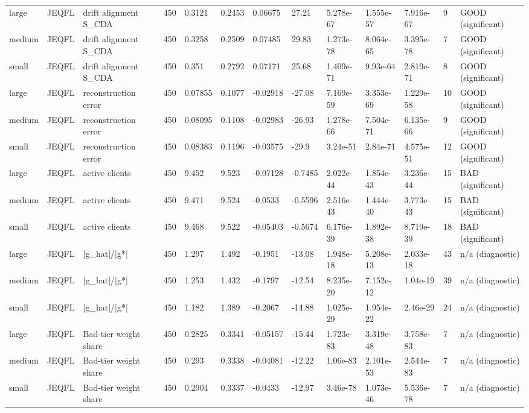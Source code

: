 \begin{table}[t]
\begin{tabular}{lllllllllllll}
large & JEQFL & drift alignment S\_CDA & 450 & 0.3121 & 0.2453 & 0.06675 & 27.21 & 5.278e-67 & 1.555e-57 & 7.916e-67 & 9 & GOOD (significant) \\
medium & JEQFL & drift alignment S\_CDA & 450 & 0.3258 & 0.2509 & 0.07485 & 29.83 & 1.273e-78 & 8.064e-65 & 3.395e-78 & 7 & GOOD (significant) \\
small & JEQFL & drift alignment S\_CDA & 450 & 0.351 & 0.2792 & 0.07171 & 25.68 & 1.409e-71 & 9.93e-64 & 2.819e-71 & 8 & GOOD (significant) \\
large & JEQFL & reconstruction error & 450 & 0.07855 & 0.1077 & -0.02918 & -27.08 & 7.169e-59 & 3.353e-69 & 1.229e-58 & 10 & GOOD (significant) \\
medium & JEQFL & reconstruction error & 450 & 0.08095 & 0.1108 & -0.02983 & -26.93 & 1.278e-66 & 7.504e-71 & 6.135e-66 & 9 & GOOD (significant) \\
small & JEQFL & reconstruction error & 450 & 0.08383 & 0.1196 & -0.03575 & -29.9 & 3.24e-51 & 2.84e-71 & 4.575e-51 & 12 & GOOD (significant) \\
large & JEQFL & active clients & 450 & 9.452 & 9.523 & -0.07128 & -0.7485 & 2.022e-44 & 1.854e-43 & 3.236e-44 & 15 & BAD (significant) \\
medium & JEQFL & active clients & 450 & 9.471 & 9.524 & -0.0533 & -0.5596 & 2.516e-43 & 1.444e-40 & 3.773e-43 & 15 & BAD (significant) \\
small & JEQFL & active clients & 450 & 9.468 & 9.522 & -0.05403 & -0.5674 & 6.176e-39 & 1.892e-38 & 8.719e-39 & 18 & BAD (significant) \\
large & JEQFL & |g\_hat|/|g*| & 450 & 1.297 & 1.492 & -0.1951 & -13.08 & 1.948e-18 & 5.208e-13 & 2.033e-18 & 43 & n/a (diagnostic) \\
medium & JEQFL & |g\_hat|/|g*| & 450 & 1.253 & 1.432 & -0.1797 & -12.54 & 8.235e-20 & 7.152e-12 & 1.04e-19 & 39 & n/a (diagnostic) \\
small & JEQFL & |g\_hat|/|g*| & 450 & 1.182 & 1.389 & -0.2067 & -14.88 & 1.025e-29 & 1.954e-22 & 2.46e-29 & 24 & n/a (diagnostic) \\
large & JEQFL & Bad-tier weight share & 450 & 0.2825 & 0.3341 & -0.05157 & -15.44 & 1.723e-83 & 3.319e-48 & 3.758e-83 & 7 & n/a (diagnostic) \\
medium & JEQFL & Bad-tier weight share & 450 & 0.293 & 0.3338 & -0.04081 & -12.22 & 1.06e-83 & 2.101e-53 & 2.544e-83 & 7 & n/a (diagnostic) \\
small & JEQFL & Bad-tier weight share & 450 & 0.2904 & 0.3337 & -0.0433 & -12.97 & 3.46e-78 & 1.073e-46 & 5.536e-78 & 7 & n/a (diagnostic) \\

\end{tabular}
\end{table}
